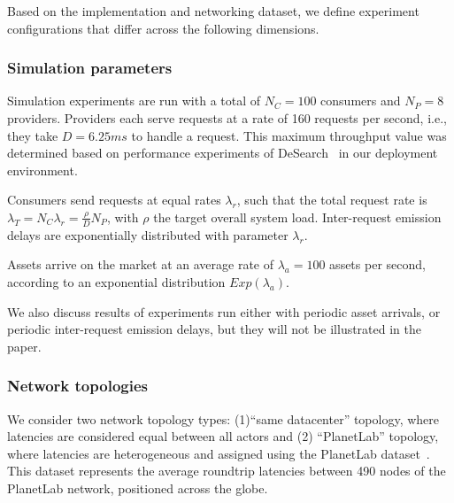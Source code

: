 Based on the implementation and networking dataset, we define experiment configurations that differ across the following dimensions.

\subsubsection{Simulation parameters}

Simulation experiments are run with a total of $N_{C}=100$ consumers and $N_{P}=8$ providers.
Providers each serve requests at a rate of 160 requests per second, i.e., they take $D=6.25ms$ to handle a request.
This maximum throughput value was determined based on performance experiments of DeSearch~\cite{liBringingDecentralizedSearch2021} in our deployment environment.

Consumers send requests at equal rates $\lambda_{r}$, such that the total request rate is $\lambda_{T}=N_{C}\lambda_{r}=\frac{\rho}{D} N_{P}$, with $\rho$ the target overall system load. 
Inter-request emission delays are exponentially distributed with parameter $\lambda_{r}$.

Assets arrive on the market at an average rate of $\lambda_{a}=100$ assets per second, according to an exponential distribution $\mathit{Exp}(\lambda_{a})$. 

We also discuss results of experiments run either with periodic asset arrivals, or periodic inter-request emission delays, but they will not be illustrated in the paper.

\subsubsection{Network topologies}
We consider two network topology types: (1)``same datacenter'' topology, where latencies are considered equal between all actors and (2) ``PlanetLab'' topology, where latencies are heterogeneous and assigned using the PlanetLab dataset~\cite{zhuNetworkLatencyEstimation2017}. This dataset represents the average roundtrip latencies between 490 nodes of the PlanetLab network, positioned across the globe. 


